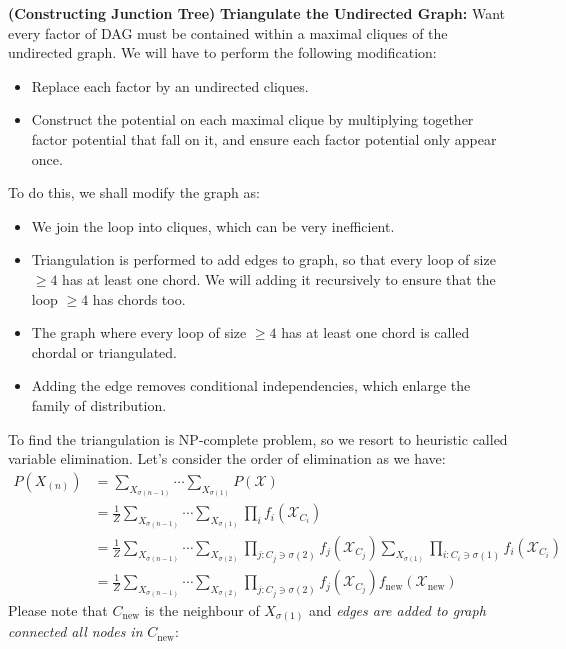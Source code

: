 \begin{definition}{\textbf{(Constructing Junction Tree)}}
    \textbf{Triangulate the Undirected Graph:} Want every factor of DAG must be contained within a maximal cliques of the undirected graph. We will have to perform the following modification:
    \begin{itemize}
        \item Replace each factor by an undirected cliques. 
        \item Construct the potential on each maximal clique by multiplying together factor potential that fall on it, and ensure each factor potential only appear once. 
    \end{itemize}
    To do this, we shall modify the graph as:
    \begin{itemize}
        \item We join the loop into cliques, which can be very inefficient. 
        \item Triangulation is performed to add edges to graph, so that every loop of size $\ge4$ has at least one chord. We will adding it recursively to ensure that the loop $\ge4$ has chords too. 
        \item The graph where every loop of size $\ge4$ has at least one chord is called chordal or triangulated. 
        \item Adding the edge removes conditional independencies, which enlarge the family of distribution. 
    \end{itemize}
    To find the triangulation is NP-complete problem, so we resort to heuristic called variable elimination. Let's consider the order of elimination as we have:
    \begin{equation*}
    \begin{aligned}
        P(X_{(n)}) &= \sum_{X_{\sigma(n-1)}}\cdots\sum_{X_{\sigma(1)}} P(\mathcal{X}) \\
        &= \frac{1}{Z}\sum_{X_{\sigma(n-1)}}\cdots\sum_{X_{\sigma(1)}} \prod_i f_i(\mathcal{X}_{C_i}) \\
        &= \frac{1}{Z}\sum_{X_{\sigma(n-1)}}\cdots\sum_{X_{\sigma(2)}}\prod_{j : C_j \ni \sigma(2)}f_j(\mathcal{X}_{C_j})\sum_{X_{\sigma(1)}} \prod_{i:C_i\ni\sigma(1)}f_i(\mathcal{X}_{C_i}) \\
        &= \frac{1}{Z}\sum_{X_{\sigma(n-1)}}\cdots\sum_{X_{\sigma(2)}}\prod_{j : C_j \ni \sigma(2)}f_j(\mathcal{X}_{C_j})f_\text{new}(\mathcal{X}_\text{new})
    \end{aligned}
    \end{equation*}
    Please note that $C_\text{new}$ is the neighbour of $X_{\sigma(1)}$ and \emph{edges are added to graph connected all nodes in} $C_\text{new}$:

\end{definition}
